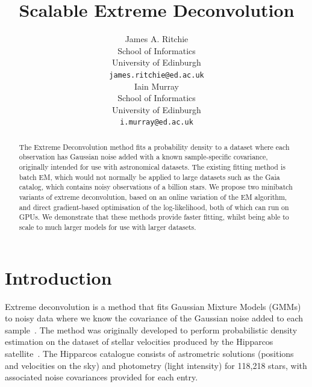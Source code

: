 \documentclass{article}
\title{Scalable Extreme Deconvolution}
\author{
  James A. Ritchie\\
  School of Informatics\\
  University of Edinburgh\\
   \texttt{james.ritchie@ed.ac.uk} \\
  \And
  Iain Murray\\
  School of Informatics\\
  University of Edinburgh\\
   \texttt{i.murray@ed.ac.uk} \\
}
\begin{document}
\maketitle

\begin{abstract}

The Extreme Deconvolution method fits a probability density to a dataset where each observation has Gaussian noise added with a known sample-specific covariance, originally intended for use with astronomical datasets.
The existing fitting method is batch EM, which would not normally be applied to large datasets such as the Gaia catalog, which contains noisy observations of a billion stars.
We propose two minibatch variants of extreme deconvolution, based on an online variation of the EM algorithm, and direct gradient-based optimisation of the log-likelihood, both of which can run on GPUs.
We demonstrate that these methods provide faster fitting, whilst being able to scale to much larger models for use with larger datasets.

\end{abstract}

\section{Introduction}

Extreme deconvolution is a method that fits Gaussian Mixture Models (GMMs) to noisy data where we know the covariance of the Gaussian noise added to each sample~\cite{bovyExtremeDeconvolutionInferring2011}.
The method was originally developed to perform probabilistic density estimation on the dataset of stellar velocities produced by the Hipparcos satellite~\cite{perrymanHipparcosCatalogue1997}.
The Hipparcos catalogue consists of astrometric solutions (positions and velocities on the sky) and photometry (light intensity) for 118,218 stars, with associated noise covariances provided for each entry.
\end{document}
